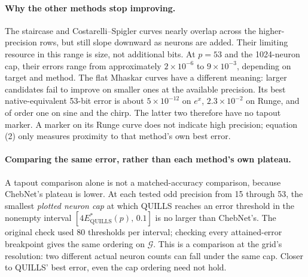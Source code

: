 \documentclass[11pt]{article}
\begin{document}
\paragraph{Why the other methods stop improving.}
The staircase and Costarelli--Spigler curves nearly overlap across the higher-precision rows, but still slope downward as neurons are added. Their limiting resource in this range is size, not additional bits. At \(p=53\) and the 1024-neuron cap, their errors range from approximately \(2\times10^{-6}\) to \(9\times10^{-3}\), depending on target and method. The flat Mhaskar curves have a different meaning: larger candidates fail to improve on smaller ones at the available precision. Its best native-equivalent 53-bit error is about \(5\times10^{-12}\) on \(e^x\), \(2.3\times10^{-2}\) on Runge, and of order one on sine and the chirp. The latter two therefore have no tapout marker. A marker on its Runge curve does not indicate high precision; equation (2) only measures proximity to that method's own best error.

\paragraph{Comparing the same error, rather than each method's own plateau.}
A tapout comparison alone is not a matched-accuracy comparison, because ChebNet's plateau is lower. At each tested odd precision from 15 through 53, the smallest \emph{plotted neuron cap} at which QUILLS reaches an error threshold in the nonempty interval \([4E_{\mathrm{QUILLS}}^*(p),\,0.1]\) is no larger than ChebNet's. The original check used 80 thresholds per interval; checking every attained-error breakpoint gives the same ordering on \(\mathcal G\). This is a comparison at the grid's resolution: two different actual neuron counts can fall under the same cap. Closer to QUILLS' best error, even the cap ordering need not hold.
\end{document}
